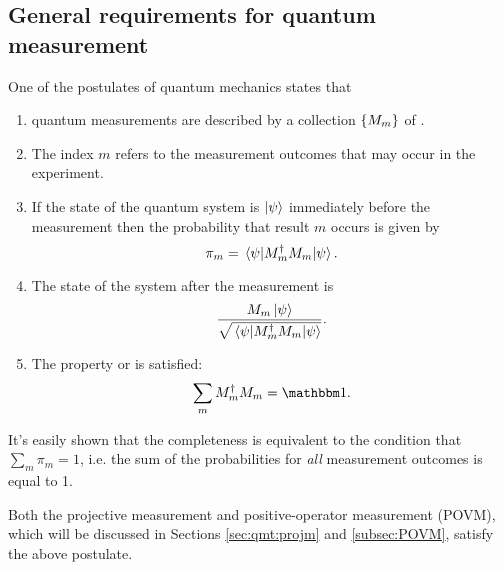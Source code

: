 \subsection{General requirements for quantum measurement}\label{sec:qmt:postulate}

One of the postulates of quantum mechanics \parencite[Sec. 2.2.3]{NielsenChuang}
states that
\begin{enumerate}
  \item
    quantum measurements are described by a collection
    $\left\{M_m\right\}$ of .
  \item
    The index $m$ refers to the measurement outcomes that
    may occur in the experiment.
  \item
    If the state of the quantum system is $\ket{\psi}$
    immediately before the measurement then the probability that result $m$ occurs is
    given by
    \begin{equation}\label{eq:qmt:postulate:prob}
      \pi_{m} = \ev{M^{\dagger}_{m} M_{m}}{\psi} \text{.}
    \end{equation}
  \item
    The state of the system after the measurement is
    \begin{equation}\label{eq:qmt:postulate:after}
      \frac{ M_m \ket{\psi} }{ \sqrt{\ev{M^{\dagger}_{m} M_{m}}{\psi}} } \text{.}
    \end{equation}
  \item
    The  property or  is satisfied:
    \begin{equation}
      \sum_m M_m^{\dagger} M_m = \idop \text{.}
    \end{equation}
\end{enumerate}

It's easily shown that the completeness is equivalent to the condition that
$\sum_m \pi_m = 1$, i.e. the sum of the probabilities for \emph{all} measurement outcomes is equal to 1.

Both the projective measurement and positive-operator measurement (POVM),
which will be discussed in Sections \ref{sec:qmt:projm} and \ref{subsec:POVM},
satisfy the above postulate.